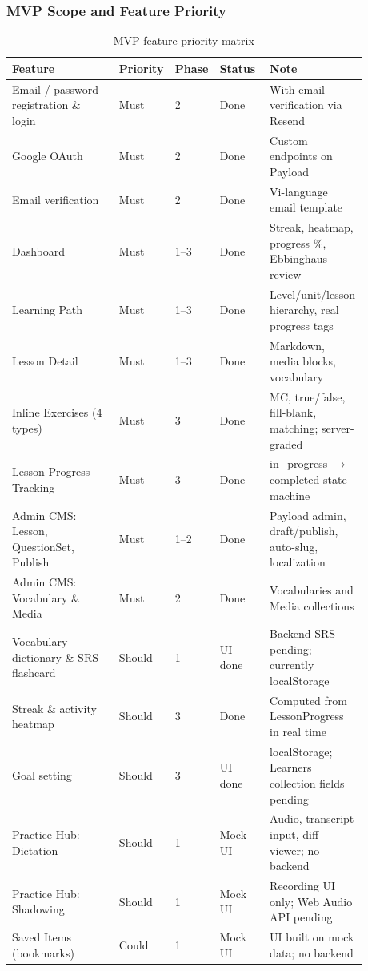 \subsubsection{MVP Scope and Feature Priority}

\begin{longtable}{p{0.30\linewidth} p{0.14\linewidth} p{0.12\linewidth} p{0.14\linewidth} p{0.18\linewidth}}
\caption{MVP feature priority matrix}\\
\toprule
Feature & Priority & Phase & Status & Note \\
\midrule
\endhead
Email / password registration \& login & Must & 2 & Done & With email verification via Resend \\
Google OAuth & Must & 2 & Done & Custom endpoints on Payload \\
Email verification & Must & 2 & Done & Vi-language email template \\
Dashboard & Must & 1--3 & Done & Streak, heatmap, progress \%, Ebbinghaus review \\
Learning Path & Must & 1--3 & Done & Level/unit/lesson hierarchy, real progress tags \\
Lesson Detail & Must & 1--3 & Done & Markdown, media blocks, vocabulary \\
Inline Exercises (4 types) & Must & 3 & Done & MC, true/false, fill-blank, matching; server-graded \\
Lesson Progress Tracking & Must & 3 & Done & in\_progress $\rightarrow$ completed state machine \\
Admin CMS: Lesson, QuestionSet, Publish & Must & 1--2 & Done & Payload admin, draft/publish, auto-slug, localization \\
Admin CMS: Vocabulary \& Media & Must & 2 & Done & Vocabularies and Media collections \\
Vocabulary dictionary \& SRS flashcard & Should & 1 & UI done & Backend SRS pending; currently localStorage \\
Streak \& activity heatmap & Should & 3 & Done & Computed from LessonProgress in real time \\
Goal setting & Should & 3 & UI done & localStorage; Learners collection fields pending \\
Practice Hub: Dictation & Should & 1 & Mock UI & Audio, transcript input, diff viewer; no backend \\
Practice Hub: Shadowing & Should & 1 & Mock UI & Recording UI only; Web Audio API pending \\
Saved Items (bookmarks) & Could & 1 & Mock UI & UI built on mock data; no backend \\

\end{longtable}
